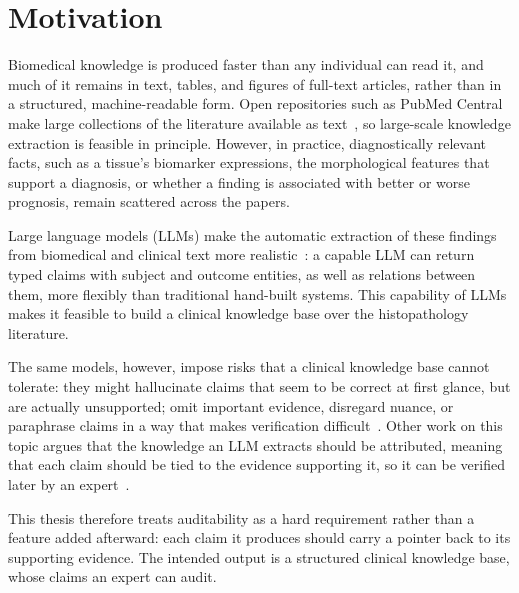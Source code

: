 \section{Motivation}\label{section:intro-motivation}

Biomedical knowledge is produced faster than any individual can read it, and much of it remains in text, tables, and figures of full-text articles, rather than in a structured, machine-readable form. Open repositories such as PubMed Central make large collections of the literature available as text~\parencite{nlm_pmc_open_access}, so large-scale knowledge extraction is feasible in principle. However, in practice, diagnostically relevant facts, such as a tissue's biomarker expressions, the morphological features that support a diagnosis, or whether a finding is associated with better or worse prognosis, remain scattered across the papers. 

Large language models (LLMs) make the automatic extraction of these findings from biomedical and clinical text more realistic~\parencite{agrawal2022largelanguagemodels}: a capable LLM can return typed claims with subject and outcome entities, as well as relations between them, more flexibly than traditional hand-built systems. This capability of LLMs makes it feasible to build a clinical knowledge base over the histopathology literature.

The same models, however, impose risks that a clinical knowledge base cannot tolerate: they might hallucinate claims that seem to be correct at first glance, but are actually unsupported; omit important evidence, disregard nuance, or paraphrase claims in a way that makes verification difficult~\parencite{huang2025surveyhallucinationlarge}. Other work on this topic argues that the knowledge an LLM extracts should be attributed, meaning that each claim should be tied to the evidence supporting it, so it can be verified later by an expert~\parencite{rashkin2023measuringattributionnatural, honovich2022truereevaluatingfactual}. 

This thesis therefore treats auditability as a hard requirement rather than a feature added afterward: each claim it produces should carry a pointer back to its supporting evidence. The intended output is a structured clinical knowledge base, whose claims an expert can audit.